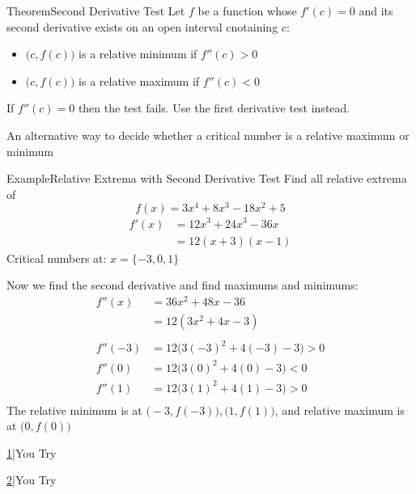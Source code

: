 \documentclass{MathNotes}
\newenvironment{example}[1]{\begin{BlueBox}{Example}{#1}}{\end{BlueBox}}
\newenvironment{theorem}[1]{\begin{GrayBox}{Theorem}{#1}}{\end{GrayBox}}
\newenvironment{practice}[2]{\begin{PurpleBox}{\texorpdfstring{#1}\Big|You Try}{#2}}{\end{PurpleBox}}
\begin{document}
\begin{theorem}{Second Derivative Test}
Let $f$ be a function whose $f'(c)=0$ and its second derivative exists on an
open interval cnotaining $c$:
\begin{itemize}
    \item $\big(c, f(c)\big)$ is a relative minimum if $f''(c)>0$
    \item $\big(c, f(c)\big)$ is a relative maximum if $f''(c)<0$
\end{itemize}
If $f''(c)=0$ then the test fails. Use the first derivative test instead.
\end{theorem}

\begin{displayquote}
An alternative way to decide whether a critical number is a
relative maximum or minimum
\end{displayquote}

\begin{example}{Relative Extrema with Second Derivative Test}
Find all relative extrema of $$f(x)=3x^4+8x^3-18x^2+5$$
\begin{align*}
f'(x)&=12x^3+24x^3-36x\\
&=12(x+3)(x-1)
\end{align*}
Critical numbers at: $x=\{-3, 0, 1\}$

Now we find the second derivative and find maximums and minimums:
\begin{align*}
f''(x)&=36x^2+48x-36\\
&=12(3x^2+4x-3)\\
\\
f''(-3)&=12\big(3(-3)^2+4(-3)-3\big)>0\\
f''(0)&=12\big(3(0)^2+4(0)-3\big)<0\\
f''(1)&=12\big(3(1)^2+4(1)-3\big)>0\\
\end{align*}
The relative minimum is at $\big(-3, f(-3)\big), \big(1, f(1)\big)$,
and relative maximum is at $\big(0, f(0)\big)$
\end{example}

\begin{multicols}{2}
\begin{practice}{\hyperref[ans:3.4-1]{1}}{}
\label{prac:3.4-1}
\end{practice}
\begin{practice}{\hyperref[ans:3.4-2]{2}}{}
\label{prac:3.4-2}
\end{practice}
\end{multicols}
\end{document}
